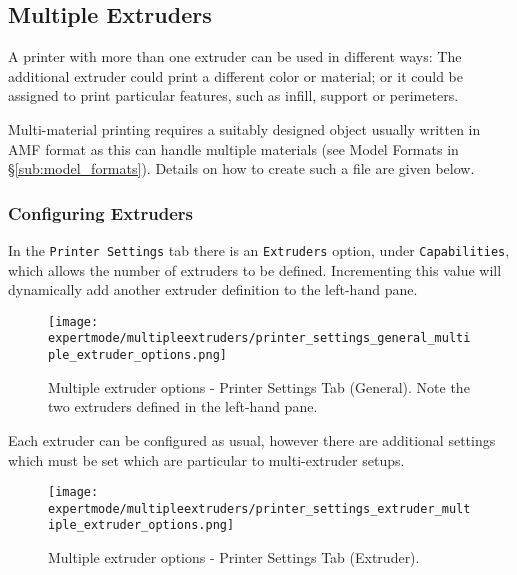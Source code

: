 
\subsection{Multiple Extruders} %
\label{sec:multiple_extruders}

A printer with more than one extruder can be used in different ways: The additional extruder could print a different color or material; or it could be assigned to print particular features, such as infill, support or perimeters.

Multi-material printing requires a suitably designed object usually written in AMF format as this can handle multiple materials (see Model Formats in §\ref{sub:model_formats}).  Details on how to create such a file are given below.


\subsubsection{Configuring Extruders} %
\label{sub:configuring_extruders}

In the \texttt{Printer Settings} tab there is an \texttt{Extruders} option, under \texttt{Capabilities}, which allows the number of extruders to be defined.  Incrementing this value will dynamically add another extruder definition to the left-hand pane.

\begin{figure}[H]
\centering
\texttt{[image: expertmode/multipleextruders/printer\_settings\_general\_multiple\_extruder\_options.png]}
\caption{Multiple extruder options - Printer Settings Tab (General).  Note the two extruders defined in the left-hand pane.}
\label{fig:printer_settings_general_multiple_extruder_options}
\end{figure}

Each extruder can be configured as usual, however there are additional settings which must be set which are particular to multi-extruder setups.

\begin{figure}[H]
\centering
\texttt{[image: expertmode/multipleextruders/printer\_settings\_extruder\_multiple\_extruder\_options.png]}
\caption{Multiple extruder options - Printer Settings Tab (Extruder).}
\label{fig:printer_settings_extruder_multiple_extruder_options}
\end{figure}

